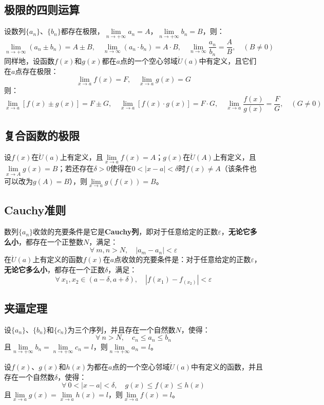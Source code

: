 \documentclass[fontset=none,openany,a4paper]{ctexbook}
\begin{document}
\subsection{极限的四则运算}

设数列$\{a_n\}$、$\{b_n\}$都存在极限，$\lim\limits_{n\to+\infty}a_n=A$，$\lim\limits_{n\to+\infty}b_n=B$，则：
\[
\lim_{n\to+\infty}(a_n \pm b_n) = A \pm B,\quad
\lim_{n\to\infty}(a_n \cdot b_n) = A \cdot B,\quad
\lim_{n\to\infty}\frac{a_n}{b_n} = \frac{A}{B},\quad (B\neq0)
\]
同样地，设函数$f(x)$和$g(x)$都在$a$点的一个空心邻域$\mathring{U}(a)$中有定义，且它们在$a$点存在极限：
\[
\lim_{x\to a}f(x) = F,\quad \lim_{x\to a}g(x) = G
\]
则：
\[
\lim_{x\to a}[f(x) \pm g(x)] = F \pm G,\quad
\lim_{x\to a}[f(x) \cdot g(x)] = F \cdot G,\quad
\lim_{x\to a}\frac{f(x)}{g(x)} = \frac{F}{G},\quad (G\neq0)
\]

\subsection{复合函数的极限}

设$f(x)$在$\mathring{U}(a)$上有定义，且$\lim\limits_{x\to a}f(x)=A$；$g(x)$在$\mathring{U}(A)$上有定义，且$\lim\limits_{x\to A}g(x)=B$；若还存在$\delta>0$使得在$0<|x-a|<\delta$时$f(x)\neq A$（该条件也可以改为$g(A)=B$），则$\lim\limits_{x\to a}g(f(x))=B$。

\subsection{Cauchy准则}

数列$\{a_n\}$收敛的充要条件是它是\textbf{Cauchy列}，即对于任意给定的正数$\varepsilon$，\textbf{无论它多么小}，都存在一个正整数$N$，满足：
\[
\forall\ m,n>N,\quad |a_m-a_n|<\varepsilon
\]
在$\mathring{U}(a)$上有定义的函数$f(x)$在$a$点收敛的充要条件是：对于任意给定的正数$\varepsilon$，\textbf{无论它多么小}，都存在一个正数$\delta$，满足：
\[
\forall\ x_1, x_2 \in (a-\delta, a+\delta),\quad \left|f(x_1)-f_(x_2)\right|<\varepsilon
\]

\subsection{夹逼定理}

设$\{a_n\}$、$\{b_n\}$和$\{c_n\}$为三个序列，并且存在一个自然数$N$，使得：
\[
\forall\ n>N,\quad c_n \leqslant a_n \leqslant b_n
\]
且$\lim\limits_{n\to+\infty}b_n=\lim\limits_{n\to+\infty}c_n=l$，则$\lim\limits_{n\to+\infty}a_n=l$。

设$f(x)$、$g(x)$和$h(x)$为都在$a$点的一个空心邻域$\mathring{U}(a)$中有定义的函数，并且存在一个自然数$\delta$，使得：
\[
\forall\ 0<|x-a|<\delta,\quad g(x) \leqslant f(x) \leqslant h(x)
\]
且$\lim\limits_{x\to a}g(x)=\lim\limits_{x\to a}h(x)=l$，则$\lim\limits_{x\to a}f(x)=l$。
\end{document}
